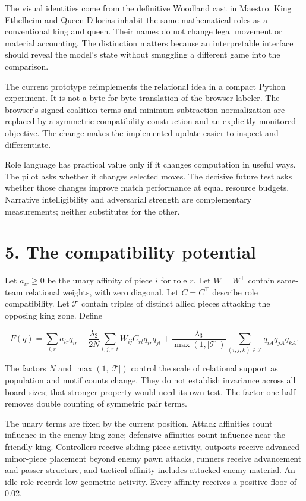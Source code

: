 \documentclass[10pt]{article}
\begin{document}
The visual identities come from the definitive Woodland cast in Maestro. King Ethelheim and Queen Dilorias inhabit the same mathematical roles as a conventional king and queen. Their names do not change legal movement or material accounting. The distinction matters because an interpretable interface should reveal the model's state without smuggling a different game into the comparison.

The current prototype reimplements the relational idea in a compact Python experiment. It is not a byte-for-byte translation of the browser labeler. The browser's signed coalition terms and minimum-subtraction normalization are replaced by a symmetric compatibility construction and an explicitly monitored objective. The change makes the implemented update easier to inspect and differentiate.

Role language has practical value only if it changes computation in useful ways. The pilot asks whether it changes selected moves. The decisive future test asks whether those changes improve match performance at equal resource budgets. Narrative intelligibility and adversarial strength are complementary measurements; neither substitutes for the other.

\clearpage
\section*{5. The compatibility potential}
Let $a_{ir}\ge0$ be the unary affinity of piece $i$ for role $r$. Let $W=W^\top$ contain same-team relational weights, with zero diagonal. Let $C=C^\top$ describe role compatibility. Let $\mathcal T$ contain triples of distinct allied pieces attacking the opposing king zone. Define

\[
F(q)=\sum_{i,r}a_{ir}q_{ir}
+\frac{\lambda_2}{2N}\sum_{i,j,r,t}W_{ij}C_{rt}q_{ir}q_{jt}
+\frac{\lambda_3}{\max(1,|\mathcal T|)}
\sum_{(i,j,k)\in\mathcal T}q_{iA}q_{jA}q_{kA}.
\]

The factors $N$ and $\max(1,|\mathcal T|)$ control the scale of relational support as population and motif counts change. They do not establish invariance across all board sizes; that stronger property would need its own test. The factor one-half removes double counting of symmetric pair terms.

The unary terms are fixed by the current position. Attack affinities count influence in the enemy king zone; defensive affinities count influence near the friendly king. Controllers receive sliding-piece activity, outposts receive advanced minor-piece placement beyond enemy pawn attacks, runners receive advancement and passer structure, and tactical affinity includes attacked enemy material. An idle role records low geometric activity. Every affinity receives a positive floor of 0.02.
\end{document}
